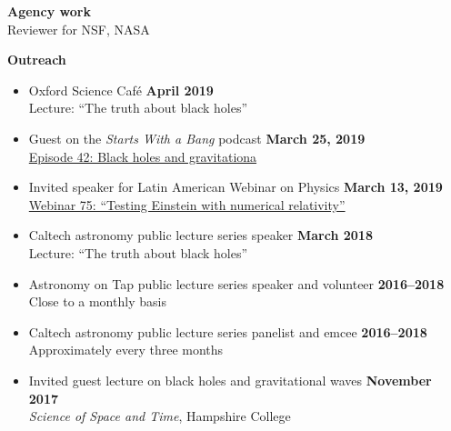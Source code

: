 \documentclass[margin,line]{res}
\begin{document}
\begin{resume}
{\bf Agency work}
\vspace*{.05in}\\
\hspace*{1em}
Reviewer for NSF, NASA

{\bf Outreach}
\vspace*{.05in}
\begin{itemize}

\item[] Oxford Science Café
  \hfill {\bf April 2019} \\
  \hspace*{1em} Lecture: ``The truth about black holes''

\item[] Guest on the {\it Starts With a Bang} podcast
  \hfill {\bf March 25, 2019} \\
  \hspace*{1em}
\href{https://soundcloud.com/ethan-siegel-172073460/starts-with-a-bang-42-black-holes-and-gravitation}{Episode 42: Black holes and gravitationa}


\item[] Invited speaker for Latin American Webinar on Physics
  \hfill {\bf March 13, 2019} \\
  \hspace*{1em} \href{https://www.youtube.com/watch?v=7HO07-QtvMI}
  {Webinar 75: ``Testing Einstein with numerical relativity''}

\item[] Caltech astronomy public lecture series speaker
  \hfill {\bf March 2018} \\
  \hspace*{1em} Lecture: ``The truth about black holes''

\item[] Astronomy on Tap public lecture series speaker and volunteer
  \hfill {\bf 2016--2018} \\
\hspace*{1em} Close to a monthly basis

\item[] Caltech astronomy public lecture series panelist and emcee
        \hfill {\bf 2016--2018} \\
\hspace*{1em} Approximately every three months

\item[] Invited guest lecture on black holes and gravitational waves \hfill {\bf November 2017} \\
\hspace*{1em} {\it Science of Space and Time}, Hampshire College


\end{itemize}
\end{resume}
\end{document}
